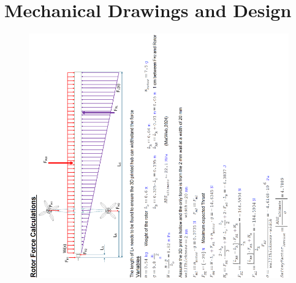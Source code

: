 \chapter{Mechanical Drawings and Design}
\label{sec: mechanical_drawing_and_design}
\begin{figure}[H]
    \centering
    \includegraphics[width =\textwidth, angle=-90]{figs/Design/Rotor/Calcs_3D_Hub_Quality.png}
\end{figure}
